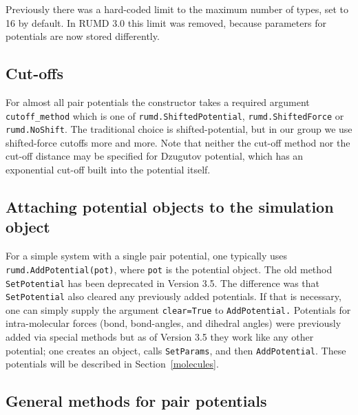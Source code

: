 \documentclass[a4paper]{article}
\begin{document}
Previously there was a hard-coded limit to the maximum number of types, set to 16 by default. In RUMD 3.0 this limit was removed, because parameters for potentials are now stored differently.

\subsection{Cut-offs}


For almost all pair potentials the
constructor takes a required argument \verb|cutoff_method| which is one of
\verb|rumd.ShiftedPotential|, \verb|rumd.ShiftedForce| or \verb|rumd.NoShift|. 
The traditional
choice is shifted-potential, but in our group we use shifted-force cutoffs 
more and more. Note that neither the cut-off method nor the cut-off distance
may be specified for Dzugutov potential, which has an exponential cut-off
 built into the potential itself.

\subsection{Attaching potential objects to the simulation object}

For a simple system with a single pair potential, one typically uses
\verb|rumd.AddPotential(pot)|, where \verb|pot| is the potential object. The old method \verb|SetPotential| has been deprecated in Version 3.5. The difference was that \verb|SetPotential| also cleared any previously added potentials. If that is necessary, one can simply supply the argument \verb|clear=True| to \verb|AddPotential.|
Potentials for intra-molecular forces (bond, 
bond-angles, and dihedral angles) were previously added via special methods but as of Version 3.5 they work like any other potential; one creates an object, calls \verb|SetParams|, and then \verb|AddPotential|. These potentials will be described in Section~\ref{molecules}.


\subsection{General methods for pair potentials}
\end{document}
